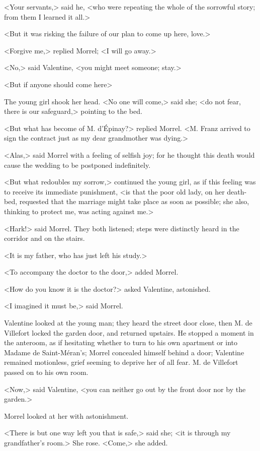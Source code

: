  <Your servants,> said he, <who were repeating the whole of the sorrowful story; from them I learned it all.> 

 <But it was risking the failure of our plan to come up here, love.> 

 <Forgive me,> replied Morrel; <I will go away.> 

 <No,> said Valentine, <you might meet someone; stay.> 

 <But if anyone should come here\longdash> 

 The young girl shook her head. <No one will come,> said she; <do not fear, there is our safeguard,> pointing to the bed. 

 <But what has become of M. d'Épinay?> replied Morrel.  <M. Franz arrived to sign the contract just as my dear grandmother was dying.> 

 <Alas,> said Morrel with a feeling of selfish joy; for he thought this death would cause the wedding to be postponed indefinitely. 

 <But what redoubles my sorrow,> continued the young girl, as if this feeling was to receive its immediate punishment, <is that the poor old lady, on her death-bed, requested that the marriage might take place as soon as possible; she also, thinking to protect me, was acting against me.> 

 <Hark!> said Morrel. They both listened; steps were distinctly heard in the corridor and on the stairs. 

 <It is my father, who has just left his study.> 

 <To accompany the doctor to the door,> added Morrel. 

 <How do you know it is the doctor?> asked Valentine, astonished. 

 <I imagined it must be,> said Morrel. 

 Valentine looked at the young man; they heard the street door close, then M. de Villefort locked the garden door, and returned upstairs. He stopped a moment in the anteroom, as if hesitating whether to turn to his own apartment or into Madame de Saint-Méran's; Morrel concealed himself behind a door; Valentine remained motionless, grief seeming to deprive her of all fear. M. de Villefort passed on to his own room. 

 <Now,> said Valentine, <you can neither go out by the front door nor by the garden.> 

 Morrel looked at her with astonishment. 

 <There is but one way left you that is safe,> said she; <it is through my grandfather's room.> She rose. <Come,> she added. 

